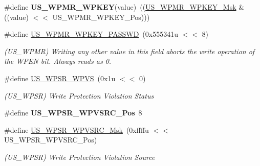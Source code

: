 \begin{DoxyCompactItemize}
\mbox{\label{group__SAMV71__USART_ga92f71dcb8627780f24fc0bca4fb16f7a}} 
\#define {\bfseries U\+S\+\_\+\+W\+P\+M\+R\+\_\+\+W\+P\+K\+EY}(value)~((\mbox{\hyperlink{group__SAMV71__USART_ga68e18606d5ce0c902f7078f5e84a95b8}{U\+S\+\_\+\+W\+P\+M\+R\+\_\+\+W\+P\+K\+E\+Y\+\_\+\+Msk}} \& ((value) $<$$<$ U\+S\+\_\+\+W\+P\+M\+R\+\_\+\+W\+P\+K\+E\+Y\+\_\+\+Pos)))
\item 
\mbox{\label{group__SAMV71__USART_ga5bcadc89cde78bdf6b072773956e7e29}} 
\#define \mbox{\hyperlink{group__SAMV71__USART_ga5bcadc89cde78bdf6b072773956e7e29}{U\+S\+\_\+\+W\+P\+M\+R\+\_\+\+W\+P\+K\+E\+Y\+\_\+\+P\+A\+S\+S\+WD}}~(0x555341u $<$$<$ 8)
\begin{DoxyCompactList}\small\item\em (U\+S\+\_\+\+W\+P\+MR) Writing any other value in this field aborts the write operation of the W\+P\+EN bit. Always reads as 0. \end{DoxyCompactList}\item 
\mbox{\label{group__SAMV71__USART_gacf130470a00a755e30a2bf46a9ccbbbd}} 
\#define \mbox{\hyperlink{group__SAMV71__USART_gacf130470a00a755e30a2bf46a9ccbbbd}{U\+S\+\_\+\+W\+P\+S\+R\+\_\+\+W\+P\+VS}}~(0x1u $<$$<$ 0)
\begin{DoxyCompactList}\small\item\em (U\+S\+\_\+\+W\+P\+SR) Write Protection Violation Status \end{DoxyCompactList}\item 
\mbox{\label{group__SAMV71__USART_gac198da9d630bfa55ed0d2ce929f49d73}} 
\#define {\bfseries U\+S\+\_\+\+W\+P\+S\+R\+\_\+\+W\+P\+V\+S\+R\+C\+\_\+\+Pos}~8
\item 
\mbox{\label{group__SAMV71__USART_ga4241a13f49c2c191c0080cce67d4aa90}} 
\#define \mbox{\hyperlink{group__SAMV71__USART_ga4241a13f49c2c191c0080cce67d4aa90}{U\+S\+\_\+\+W\+P\+S\+R\+\_\+\+W\+P\+V\+S\+R\+C\+\_\+\+Msk}}~(0xffffu $<$$<$ U\+S\+\_\+\+W\+P\+S\+R\+\_\+\+W\+P\+V\+S\+R\+C\+\_\+\+Pos)
\begin{DoxyCompactList}\small\item\em (U\+S\+\_\+\+W\+P\+SR) Write Protection Violation Source \end{DoxyCompactList}\item 

\end{DoxyCompactItemize}
